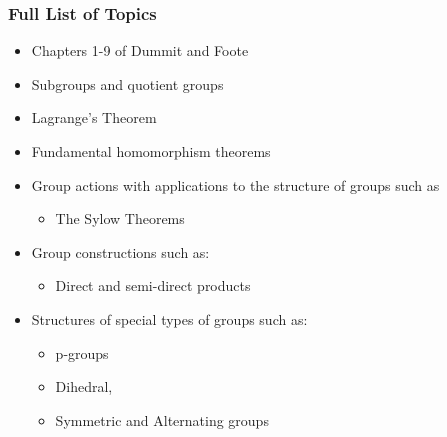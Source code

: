 \hypertarget{full-list-of-topics}{%
\subsubsection{Full List of Topics}\label{full-list-of-topics}}

\begin{itemize}
\item
  Chapters 1-9 of Dummit and Foote
\item
  Subgroups and quotient groups
\item
  Lagrange's Theorem
\item
  Fundamental homomorphism theorems
\item
  Group actions with applications to the structure of groups such as

  \begin{itemize}
  \tightlist
  \item
    The Sylow Theorems
  \end{itemize}
\item
  Group constructions such as:

  \begin{itemize}
  \tightlist
  \item
    Direct and semi-direct products
  \end{itemize}
\item
  Structures of special types of groups such as:

  \begin{itemize}
  \tightlist
  \item
    p-groups
  \item
    Dihedral,
  \item
    Symmetric and Alternating groups


\end{itemize}
\end{itemize}
